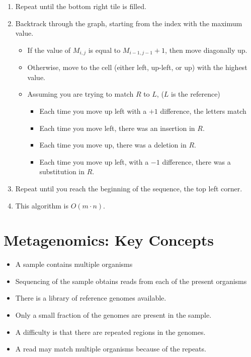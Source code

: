 \documentclass[10pt]{article}
\begin{document}
\begin{enumerate}
\begin{itemize}
    \end{itemize}
    \item Repeat until the bottom right tile is filled.
    \item Backtrack through the graph, starting from the index with the maximum value.
    \begin{itemize}
        \item If the value of $M_{i, j}$ is equal to $M_{i - 1, j - 1} + 1$, then move diagonally up.
        \item Otherwise, move to the cell (either left, up-left, or up) with the highest value.
        \item Assuming you are trying to match $R$ to $L$, ($L$ is the reference)
        \begin{itemize}
            \item Each time you move up left with a $+1$ difference, the letters match
            \item Each time you move left, there was an insertion in $R$.
            \item Each time you move up, there was a deletion in $R$.
            \item Each time you move up left, with a $-1$ difference, there was a substitution in $R$.
        \end{itemize}
    \end{itemize}
    \item Repeat until you reach the beginning of the sequence, the top left corner.
    \item This algorithm is $O(m \cdot n)$.
\end{enumerate}

\section*{Metagenomics: Key Concepts}
\begin{itemize}
    \item A sample contains multiple organisms
    \item Sequencing of the sample obtains reads from each of the present organisms
    \item There is a library of reference genomes available. 
    \item Only a small fraction of the genomes are present in the sample.
    \item A difficulty is that there are repeated regions in the genomes.
    \item A read may match multiple organisms because of the repeats.
\end{itemize}
\end{document}
